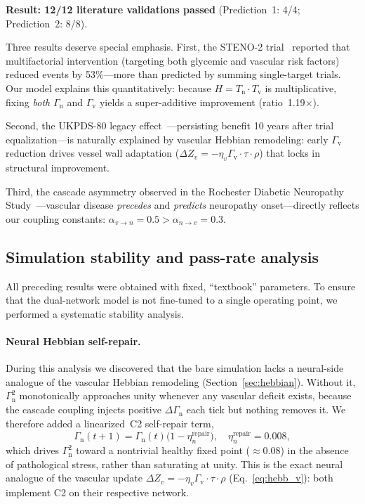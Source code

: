 ﻿\documentclass[aps,pre,twocolumn,superscriptaddress,floatfix]{revtex4-2}
\newcommand{\Gv}{\Gamma_{\mathrm{v}}}
\newcommand{\Gn}{\Gamma_{\mathrm{n}}}
\newcommand{\Tv}{T_{\mathrm{v}}}
\newcommand{\Tn}{T_{\mathrm{n}}}
\begin{document}
\textbf{Result: 12/12 literature validations passed}
(Prediction~1: 4/4; Prediction~2: 8/8).

Three results deserve special emphasis.
First, the STENO-2 trial~\cite{Gaede2008} reported that
multifactorial intervention (targeting both glycemic
and vascular risk factors) reduced events by 53\%---more
than predicted by summing single-target trials.  Our model
explains this quantitatively: because $H = \Tn \cdot \Tv$
is multiplicative, fixing \emph{both} $\Gn$ and $\Gv$
yields a super-additive improvement (ratio~1.19$\times$).

Second, the UKPDS-80 legacy effect~\cite{Holman2008}---persisting
benefit 10 years after trial equalization---is naturally
explained by vascular Hebbian remodeling: early
$\Gv$ reduction drives vessel wall adaptation
($\Delta Z_v = -\eta_v \Gv \cdot \tau \cdot \rho$)
that locks in structural improvement.

Third, the cascade asymmetry observed in the Rochester
Diabetic Neuropathy Study~\cite{Dyck1993}---vascular
disease \emph{precedes} and \emph{predicts} neuropathy
onset---directly reflects our coupling constants:
$\alpha_{v \to n} = 0.5 > \alpha_{n \to v} = 0.3$.


\subsection{Simulation stability and pass-rate analysis}\label{sec:stability}

All preceding results were obtained with fixed, ``textbook'' parameters.
To ensure that the dual-network model is not fine-tuned to a single
operating point, we performed a systematic stability analysis.

\paragraph{Neural Hebbian self-repair.}
During this analysis we discovered that the bare simulation lacks a
neural-side analogue of the vascular Hebbian remodeling
(Section~\ref{sec:hebbian}).
Without it, $\Gn^2$ monotonically approaches unity whenever
any vascular deficit exists, because the cascade coupling
injects positive $\Delta\Gn$ each tick but nothing removes it.
We therefore added a linearized~C2 self-repair term,
\begin{equation}
  \Gn(t+1) = \Gn(t)\bigl(1 - \eta_n^{\text{repair}}\bigr),
  \quad \eta_n^{\text{repair}} = 0.008,
  \label{eq:neural-repair}
\end{equation}
which drives $\Gn^2$ toward a nontrivial healthy fixed point
($\approx 0.08$) in the absence of pathological stress,
rather than saturating at unity.
This is the exact neural analogue of the vascular update
$\Delta Z_v = -\eta_v \Gv \cdot \tau \cdot \rho$
(Eq.~\ref{eq:hebb_v}): both implement C2 on their
respective network.
\end{document}
